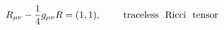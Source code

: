 \begin{equation}
R_{\mu \nu}-\frac{1}{4} g_{\mu \nu} R =(1,1),~~~~~~~{\rm traceless ~~Ricci~~ tensor}
\end{equation}

